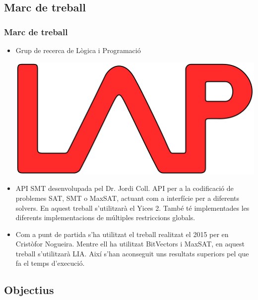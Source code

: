 \documentclass[13pt]{beamer}
\begin{document}
  \subsection{Marc de treball}
  \begin{frame}
    \frametitle{Marc de treball}
    \begin{itemize}
      \item \begin{minipage}{.55\textwidth}
        Grup de recerca de Lògica i Programació
      \end{minipage} 
      \begin{minipage}{.15\textwidth}
        \includegraphics[width=\textwidth]{Diagrames/LAP.png}
      \end{minipage} 
      \item API SMT desenvolupada pel Dr. Jordi Coll. API per a la codificació de problemes SAT, SMT o MaxSAT, 
      actuant com a interfície per a diferents solvers. En aquest treball s'utilitzarà el Yices 2. 
      També té implementades les diferents implementacions de múltiples restriccions globals.

      \item Com a punt de partida s'ha utilitzat el treball realitzat el 2015 per en Cristòfor Nogueira. 
      Mentre ell ha utilitzat BitVectors i MaxSAT, en aquest treball s'utilitzarà LIA. 
      Així s'han aconseguit uns resultats superiors pel que fa el temps d'execució.
    \end{itemize}

  \end{frame}
  
  \subsection{Objectius}
\end{document}
